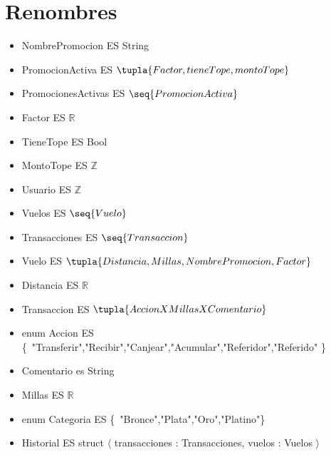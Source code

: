 \documentclass[11pt,a4paper]{article}
\begin{document}
\maketitle

\section{Renombres}

\begin{itemize}
    \item[]NombrePromocion ES String
    \item[]PromocionActiva ES $\tupla{Factor, tieneTope, montoTope}$
    \item[]PromocionesActivas ES $\seq{PromocionActiva}$
    \item[]Factor ES $\mathbb{R}$ 
    \item[]TieneTope ES Bool
    \item[]MontoTope ES $\mathbb{Z}$    
    \item[]Usuario ES $\mathbb{Z}$  
    \item[]Vuelos ES $\seq{Vuelo}$
    \item[]Transacciones ES $\seq{Transaccion}$
    \item[]Vuelo ES $\tupla{Distancia,Millas,NombrePromocion,Factor}$
    \item[]Distancia ES $\mathbb{R}$
    \item[]Transaccion ES $\tupla{Accion X Millas X Comentario}$
    \item[]enum Accion ES \{\ "Transferir","Recibir","Canjear","Acumular","Referidor","Referido" \}\ 
    \item[]Comentario es String 
    \item[]Millas ES $\mathbb{R}$     
    \item[]enum Categoria ES \{\ "Bronce","Plata","Oro","Platino"\}\
    \item[]Historial ES struct $\langle$ transacciones : Transacciones, vuelos : Vuelos $\rangle$
    
\end{itemize}
\end{document}
